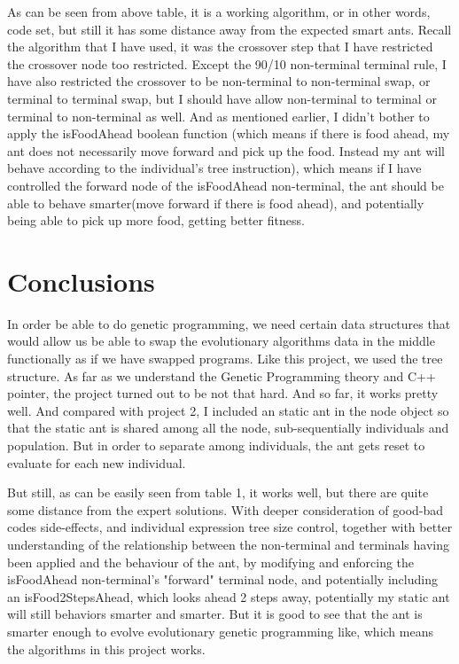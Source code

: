 \documentclass[10pt,b5paper]{article}
\begin{document}
As can be seen from above table, it is a working algorithm, or in other words, code set, but still it has some distance away from the expected smart ants. Recall the algorithm that I have used, it was the crossover step that I have restricted the crossover node too restricted. Except the 90/10 non-terminal terminal rule, I have also restricted the crossover to be non-terminal to non-terminal swap, or terminal to terminal swap, but I should have allow non-terminal to terminal or terminal to non-terminal as well. 
And as mentioned earlier, I didn't bother to apply the isFoodAhead boolean function (which means if there is food ahead, my ant does not necessarily move forward and pick up the food. Instead my ant will behave according to the individual's tree instruction), which means if I have controlled the forward node of the isFoodAhead non-terminal, the ant should be able to behave smarter(move forward if there is food ahead), and potentially being able to pick up more food, getting better fitness.
\section{Conclusions}
\label{sec-3}

In order be able to do genetic programming, we need certain data structures that would allow us be able to swap the evolutionary algorithms data in the middle functionally as if we have swapped programs. Like this project, we used the tree structure. As far as we understand the Genetic Programming theory and C++ pointer, the project turned out to be not that hard. And so far, it works pretty well. 
And compared with project 2, I included an static ant in the node object so that the static ant is shared among all the node, sub-sequentially individuals and population. But in order to separate among individuals, the ant gets reset to evaluate for each new individual.

But still, as can be easily seen from table 1, it works well, but there are quite some distance from the expert solutions. With deeper consideration of good-bad codes side-effects, and individual expression tree size control, together with better understanding of the relationship between the non-terminal and terminals having been applied and the behaviour of the ant, by modifying and enforcing the isFoodAhead non-terminal's "forward" terminal node, and potentially including an isFood2StepsAhead, which looks ahead 2 steps away, potentially my static ant will still behaviors smarter and smarter. But it is good to see that the ant is smarter enough to evolve evolutionary genetic programming like, which means the algorithms in this project works.
\end{document}
